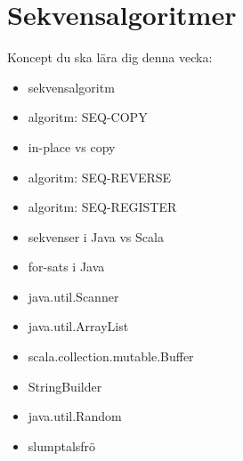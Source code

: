 \chapter{Sekvensalgoritmer}\label{chapter:W05}
Koncept du ska lära dig denna vecka:
\begin{multicols}{2}\begin{itemize}[nosep,label={$\square$},leftmargin=*]
\item sekvensalgoritm
\item algoritm: SEQ-COPY
\item in-place vs copy
\item algoritm: SEQ-REVERSE
\item algoritm: SEQ-REGISTER
\item sekvenser i Java vs Scala
\item for-sats i Java
\item java.util.Scanner
\item java.util.ArrayList
\item scala.collection.mutable.Buffer
\item StringBuilder
\item java.util.Random
\item slumptalsfrö\end{itemize}\end{multicols}
